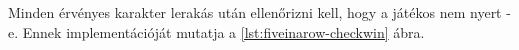 \texttt{}



Minden érvényes karakter lerakás után ellenőrizni kell, hogy a játékos nem nyert -e. Ennek implementációját mutatja a \ref{lst:fiveinarow-checkwin} ábra.


